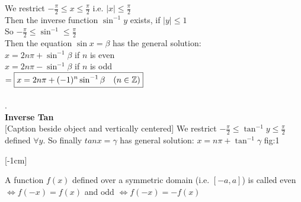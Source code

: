 We restrict $-\frac{\pi}{2} \leq x \leq \frac{\pi}{2}$ i.e. $|x| \leq \frac{\pi}{2}$\\

Then the inverse function $\sin^{-1}y$ exists, if $|y| \leq 1$\\

So $-\frac{\pi}{2} \leq \sin^{-1} \leq \frac{\pi}{2}$\\

Then the equation $\sin x = \beta$ has the general solution:\\

$x = 2n\pi + \sin^{-1}\beta$ if $n$ is even\\
$x = 2n\pi - \sin^{-1}\beta$ if $n$ is odd\\ \vspace{2pt}
$= \boxed{ x = 2n\pi + (-1)^n \sin^{-1}\beta \quad (n \in \mathbb{Z})}$\\\\

.\\

\textbf{Inverse Tan}\\


[Caption beside object and vertically centered]{ 
We restrict $-\frac{\pi}{2} \leq \tan^{-1}y \leq \frac{\pi}{2}$ defined $\forall y$.
So finally $tanx = \gamma$ has general solution: $\boxed{x = n\pi + \tan^{-1}\gamma}$
}{fig:1}



\pagebreak

 [-1cm]
\vspace*{-5pt}
\begin{Definition} \begin{shaded}
A function $f(x)$ defined over a symmetric domain (i.e. $[-a,a]$) is called even $\iff f(-x) = f(x)$ and odd $\iff f(-x) = -f(x)$ \end{shaded}
\end{Definition}

